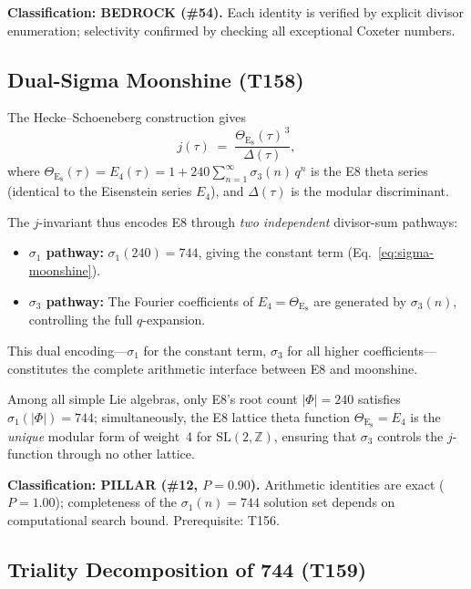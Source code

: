 \documentclass[aps,prd,twocolumn,superscriptaddress,floatfix,nofootinbib]{revtex4-2}
\theoremstyle{definition}
\theoremstyle{remark}
\begin{document}
\textbf{Classification: BEDROCK (\#54).}  Each identity is verified
by explicit divisor enumeration; selectivity confirmed by checking all
exceptional Coxeter numbers.

\subsection{Dual-Sigma Moonshine (T158)}
\label{sec:dual-sigma}

The Hecke--Schoeneberg construction gives
\begin{equation}
  j(\tau) \;=\; \frac{\Theta_{\mathrm{E}_8}(\tau)^{\,3}}{\Delta(\tau)},
  \label{eq:hecke-schoeneberg}
\end{equation}
where $\Theta_{\mathrm{E}_8}(\tau) = E_4(\tau) = 1 + 240\sum_{n=1}^{\infty}
\sigma_3(n)\,q^n$ is the E8 theta series (identical to the Eisenstein
series $E_4$), and $\Delta(\tau)$ is the modular discriminant.

The $j$-invariant thus encodes E8 through \emph{two independent}
divisor-sum pathways:
\begin{itemize}
  \item \textbf{$\sigma_1$ pathway:} $\sigma_1(240) = 744$, giving the
    constant term (Eq.~\eqref{eq:sigma-moonshine}).
  \item \textbf{$\sigma_3$ pathway:} The Fourier coefficients
    of $E_4 = \Theta_{\mathrm{E}_8}$ are generated by $\sigma_3(n)$,
    controlling the full $q$-expansion.
\end{itemize}
This dual encoding---$\sigma_1$ for the constant term, $\sigma_3$ for all
higher coefficients---constitutes the complete arithmetic interface between
E8 and moonshine.

Among all simple Lie algebras, only E8's root count $|\Phi| = 240$
satisfies $\sigma_1(|\Phi|) = 744$; simultaneously, the E8 lattice
theta function $\Theta_{\mathrm{E}_8} = E_4$ is the \emph{unique}
modular form of weight~4 for $\mathrm{SL}(2,\mathbb{Z})$, ensuring
that $\sigma_3$ controls the $j$-function through no other lattice.

\textbf{Classification: PILLAR (\#12, $P{=}0.90$).}  Arithmetic
identities are exact ($P{=}1.00$); completeness of the $\sigma_1(n){=}744$
solution set depends on computational search bound.
Prerequisite: T156.

\subsection{Triality Decomposition of 744 (T159)}
\label{sec:triality-744}
\end{document}
